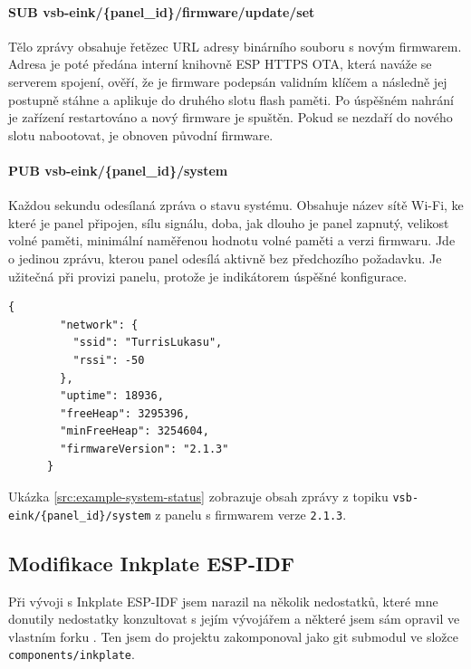 \paragraph*{SUB vsb-eink/\{panel\_id\}/firmware/update/set}
Tělo zprávy obsahuje řetězec URL adresy binárního souboru s novým firmwarem. Adresa je poté předána interní knihovně ESP HTTPS OTA, která naváže se serverem spojení, ověří, že je firmware podepsán validním klíčem a následně jej postupně stáhne a aplikuje do druhého slotu flash paměti. Po úspěšném nahrání je zařízení restartováno a nový firmware je spuštěn. Pokud se nezdaří do nového slotu nabootovat, je obnoven původní firmware.

\paragraph*{PUB vsb-eink/\{panel\_id\}/system}
Každou sekundu odesílaná zpráva o stavu systému. Obsahuje název sítě Wi-Fi, ke které je panel připojen, sílu signálu, doba, jak dlouho je panel zapnutý, velikost volné paměti, minimální naměřenou hodnotu volné paměti a verzi firmwaru. Jde o jedinou zprávu, kterou panel odesílá aktivně bez předchozího požadavku. Je užitečná při provizi panelu, protože je indikátorem úspěšné konfigurace.

\begin{lstlisting}[label=src:example-system-status,caption={Ukázka zprávy stavu systému}]
    {
        "network": {
          "ssid": "TurrisLukasu",
          "rssi": -50
        },
        "uptime": 18936,
        "freeHeap": 3295396,
        "minFreeHeap": 3254604,
        "firmwareVersion": "2.1.3"
      }
\end{lstlisting}

Ukázka \ref{src:example-system-status} zobrazuje obsah zprávy z topiku \lstinline|vsb-eink/{panel_id}/system| z panelu s firmwarem verze \verb|2.1.3|.

\subsection{Modifikace Inkplate ESP-IDF}
Při vývoji s Inkplate ESP-IDF jsem narazil na několik nedostatků, které mne donutily nedostatky konzultovat s jejím vývojářem a některé jsem sám opravil ve vlastním forku \cite{TajnymagESPIDFInkPlateESPIDFInkPlate}. Ten jsem do projektu zakomponoval jako git submodul ve složce \verb|components/inkplate|.


